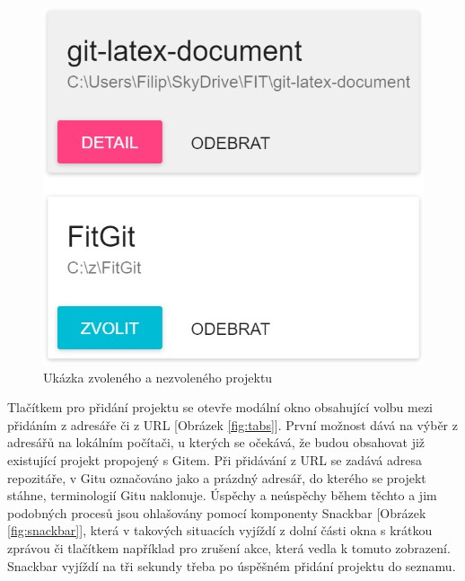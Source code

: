 \FloatBarrier
\begin{figure}[ht]
	\centering
	\includegraphics[scale=0.5]{sections/ui/images/projects.png}
	\caption[Projekty]{Ukázka zvoleného a nezvoleného projektu}
	\label{fig:projects}
\end{figure}
\FloatBarrier

Tlačítkem pro přidání projektu se otevře modální okno obsahující volbu mezi přidáním z adresáře či z URL [Obrázek \ref{fig:tabs}]. První možnost dává na výběr z adresářů na lokálním počítači, u kterých se očekává, že budou obsahovat již existující projekt propojený s Gitem. Při přidávání z URL se zadává adresa repozitáře, v Gitu označováno jako  a prázdný adresář, do kterého se projekt stáhne, terminologií Gitu naklonuje. Úspěchy a neúspěchy během těchto a jim podobných procesů jsou ohlašovány pomocí komponenty Snackbar [Obrázek \ref{fig:snackbar}], která v takových situacích vyjíždí z dolní části okna s krátkou zprávou či tlačítkem například pro zrušení akce, která vedla k tomuto zobrazení. Snackbar vyjíždí na tři sekundy třeba po úspěšném přidání projektu do seznamu.

